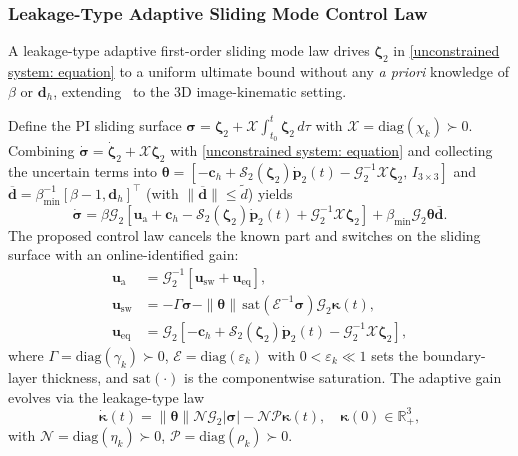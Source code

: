 \subsubsection{Leakage-Type Adaptive Sliding Mode Control Law} \label{asmc law: section}
A leakage-type adaptive first-order sliding mode law drives $\boldsymbol{\zeta}_2$ in \eqref{unconstrained system: equation} to a uniform ultimate bound without any \emph{a priori} knowledge of $\beta$ or $\boldsymbol{d}_h$, extending~\cite{singhal2025} to the 3D image-kinematic setting.

Define the PI sliding surface $\boldsymbol{\sigma}=\boldsymbol{\zeta}_2+\mathcal{X}\!\int_{t_0}^{t}\boldsymbol{\zeta}_2\,d\tau$ with $\mathcal{X}=\text{diag}(\chi_k)\succ 0$. Combining $\dot{\boldsymbol{\sigma}}=\dot{\boldsymbol{\zeta}}_2+\mathcal{X}\boldsymbol{\zeta}_2$ with \eqref{unconstrained system: equation} and collecting the uncertain terms into $\boldsymbol{\theta}=[-\boldsymbol{c}_h+\mathcal{S}_2(\boldsymbol{\zeta}_2)\dot{\boldsymbol{p}}_2(t)-\mathcal{G}_2^{-1}\mathcal{X}\boldsymbol{\zeta}_2,\,I_{3\times 3}]$ and $\boldsymbol{\overline{d}}=\beta_{\min}^{-1}[\beta-1,\boldsymbol{d}_h]^\top$ (with $\|\boldsymbol{\overline{d}}\|\le\tilde{d}$) yields
\begin{equation} \label{sigma derivative: equation 2}
    \dot{\boldsymbol{\sigma}} = \beta\mathcal{G}_2\!\left[\boldsymbol{u}_\text{a}+\boldsymbol{c}_h-\mathcal{S}_2(\boldsymbol{\zeta}_2)\dot{\boldsymbol{p}}_2(t)+\mathcal{G}_2^{-1}\mathcal{X}\boldsymbol{\zeta}_2\right] + \beta_{\min}\mathcal{G}_2\boldsymbol{\theta}\boldsymbol{\overline{d}}.
\end{equation}
The proposed control law cancels the known part and switches on the sliding surface with an online-identified gain:
\begin{align} \label{adaptive control law: equation}
    \boldsymbol{u}_\text{a} &= \mathcal{G}_2^{-1}[\boldsymbol{u}_\text{sw}+\boldsymbol{u}_\text{eq}],\nonumber\\
    \boldsymbol{u}_\text{sw} &= -\Gamma\boldsymbol{\sigma} - \|\boldsymbol{\theta}\|\,\text{sat}(\mathcal{E}^{-1}\boldsymbol{\sigma})\mathcal{G}_2\boldsymbol{\kappa}(t),\\
    \boldsymbol{u}_\text{eq} &= \mathcal{G}_2\!\left[-\boldsymbol{c}_h+\mathcal{S}_2(\boldsymbol{\zeta}_2)\dot{\boldsymbol{p}}_2(t)-\mathcal{G}_2^{-1}\mathcal{X}\boldsymbol{\zeta}_2\right],\nonumber
\end{align}
where $\Gamma=\text{diag}(\gamma_k)\succ 0$, $\mathcal{E}=\text{diag}(\varepsilon_k)$ with $0<\varepsilon_k\ll 1$ sets the boundary-layer thickness, and $\text{sat}(\cdot)$ is the componentwise saturation. The adaptive gain evolves via the leakage-type law
\begin{equation} \label{adaptive law: equation}
    \dot{\boldsymbol{\kappa}}(t) = \|\boldsymbol{\theta}\|\mathcal{N}\mathcal{G}_2|\boldsymbol{\sigma}| - \mathcal{N}\mathcal{P}\boldsymbol{\kappa}(t),\quad\boldsymbol{\kappa}(0)\in\mathbb{R}_+^3,
\end{equation}
with $\mathcal{N}=\text{diag}(\eta_k)\succ 0$, $\mathcal{P}=\text{diag}(\rho_k)\succ 0$.

